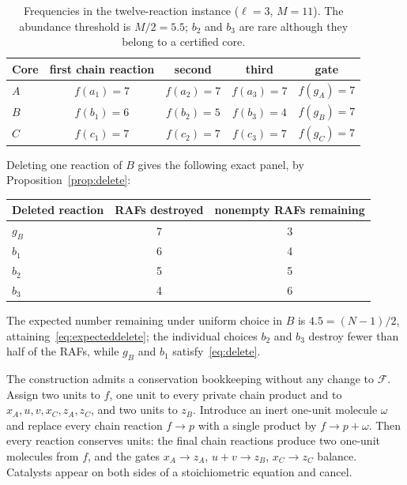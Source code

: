 \documentclass[11pt,a4paper]{article}
\theoremstyle{plain}
\theoremstyle{definition}
\theoremstyle{remark}
\newcommand{\FF}{\mathcal F}
\begin{document}
\begin{table}[htbp]\centering
\caption{Frequencies in the twelve-reaction instance ($\ell=3$, $M=11$). The abundance threshold is $M/2=5.5$; $b_2$ and $b_3$ are rare although they belong to a certified core.}\label{tab:frequency}
\begin{tabular}{@{}lcccc@{}}\toprule
Core & first chain reaction & second & third & gate\\\midrule
$A$ & $f(a_1)=7$ & $f(a_2)=7$ & $f(a_3)=7$ & $f(g_A)=7$\\
$B$ & $f(b_1)=6$ & $f(b_2)=5$ & $f(b_3)=4$ & $f(g_B)=7$\\
$C$ & $f(c_1)=7$ & $f(c_2)=7$ & $f(c_3)=7$ & $f(g_C)=7$\\\bottomrule
\end{tabular}
\end{table}

Deleting one reaction of $B$ gives the following exact panel, by Proposition~\ref{prop:delete}:
\begin{center}
\begin{tabular}{@{}lcc@{}}\toprule
Deleted reaction & RAFs destroyed & nonempty RAFs remaining\\\midrule
$g_B$ & 7 & 3\\ $b_1$ & 6 & 4\\ $b_2$ & 5 & 5\\ $b_3$ & 4 & 6\\\bottomrule
\end{tabular}
\end{center}
The expected number remaining under uniform choice in $B$ is $4.5=(N-1)/2$, attaining~\eqref{eq:expecteddelete}; the individual choices $b_2$ and $b_3$ destroy fewer than half of the RAFs, while $g_B$ and $b_1$ satisfy~\eqref{eq:delete}.

The construction admits a conservation bookkeeping without any change to $\FF$. Assign two units to $f$, one unit to every private chain product and to $x_A,u,v,x_C,z_A,z_C$, and two units to $z_B$. Introduce an inert one-unit molecule $\omega$ and replace every chain reaction $f\to p$ with a single product by $f\to p+\omega$. Then every reaction conserves units: the final chain reactions produce two one-unit molecules from $f$, and the gates $x_A\to z_A$, $u+v\to z_B$, $x_C\to z_C$ balance. Catalysts appear on both sides of a stoichiometric equation and cancel.
\end{document}

